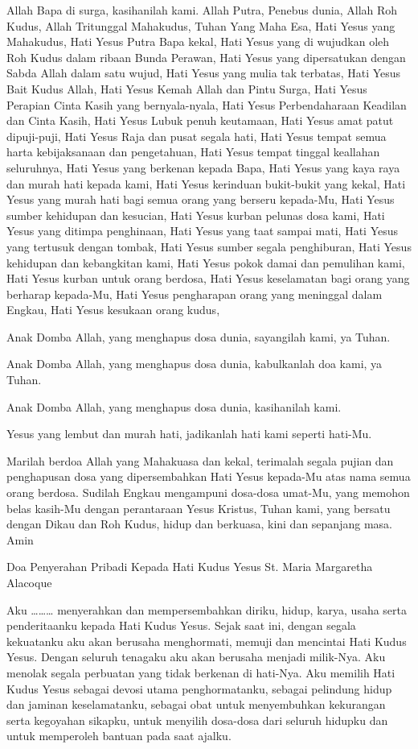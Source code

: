 \documentclass[a5paper,headsepline,titlepage,11pt,nnormalheadings,DIVcalc]{scrbook}
\begin{document}
Allah Bapa di surga, kasihanilah kami.
Allah Putra, Penebus dunia,
Allah Roh Kudus,
Allah Tritunggal Mahakudus, Tuhan Yang Maha Esa,
Hati Yesus yang Mahakudus,
Hati Yesus Putra Bapa kekal,
Hati Yesus yang di wujudkan oleh Roh Kudus dalam ribaan Bunda Perawan,
Hati Yesus yang dipersatukan dengan Sabda Allah dalam satu wujud,
Hati Yesus yang mulia tak terbatas,
Hati Yesus Bait Kudus Allah,
Hati Yesus Kemah Allah dan Pintu Surga,
Hati Yesus Perapian Cinta Kasih yang bernyala-nyala,
Hati Yesus Perbendaharaan Keadilan dan Cinta Kasih,
Hati Yesus Lubuk penuh keutamaan,
Hati Yesus amat patut dipuji-puji,
Hati Yesus Raja dan pusat segala hati,
Hati Yesus tempat semua harta kebijaksanaan dan pengetahuan,
Hati Yesus tempat tinggal keallahan seluruhnya,
Hati Yesus yang berkenan kepada Bapa,
Hati Yesus yang kaya raya dan murah hati kepada kami,
Hati Yesus kerinduan bukit-bukit yang kekal,
Hati Yesus yang murah hati bagi semua orang yang berseru kepada-Mu,
Hati Yesus sumber kehidupan dan kesucian,
Hati Yesus kurban pelunas dosa kami,
Hati Yesus yang ditimpa penghinaan,
Hati Yesus yang taat sampai mati,
Hati Yesus yang tertusuk dengan tombak,
Hati Yesus sumber segala penghiburan,
Hati Yesus kehidupan dan kebangkitan kami,
Hati Yesus pokok damai dan pemulihan kami,
Hati Yesus kurban untuk orang berdosa,
Hati Yesus keselamatan bagi orang yang berharap kepada-Mu,
Hati Yesus pengharapan orang yang meninggal dalam Engkau,
Hati Yesus kesukaan orang kudus,

Anak Domba Allah, yang menghapus dosa dunia,
sayangilah kami, ya Tuhan.

Anak Domba Allah, yang menghapus dosa dunia,
kabulkanlah doa kami, ya Tuhan.

Anak Domba Allah, yang menghapus dosa dunia,
kasihanilah kami.

Yesus yang lembut dan murah hati,
jadikanlah hati kami seperti hati-Mu.

Marilah berdoa
Allah yang Mahakuasa dan kekal, terimalah segala pujian dan penghapusan dosa yang dipersembahkan Hati Yesus kepada-Mu atas nama semua orang berdosa. Sudilah Engkau mengampuni dosa-dosa umat-Mu, yang memohon belas kasih-Mu dengan perantaraan Yesus Kristus, Tuhan kami, yang bersatu dengan Dikau dan Roh Kudus, hidup dan berkuasa, kini dan sepanjang masa. Amin

Doa Penyerahan Pribadi Kepada Hati Kudus Yesus
St. Maria Margaretha Alacoque

Aku ……… menyerahkan dan mempersembahkan diriku, hidup, karya, usaha serta penderitaanku kepada Hati Kudus Yesus. Sejak saat ini, dengan segala kekuatanku aku akan berusaha menghormati, memuji dan mencintai Hati Kudus Yesus. Dengan seluruh tenagaku aku akan berusaha menjadi milik-Nya. Aku menolak segala perbuatan yang tidak berkenan di hati-Nya. Aku memilih Hati Kudus Yesus sebagai devosi utama penghormatanku, sebagai pelindung hidup dan jaminan keselamatanku, sebagai obat untuk menyembuhkan kekurangan serta kegoyahan sikapku, untuk menyilih dosa-dosa dari seluruh hidupku dan untuk memperoleh bantuan pada saat ajalku.
\end{document}
